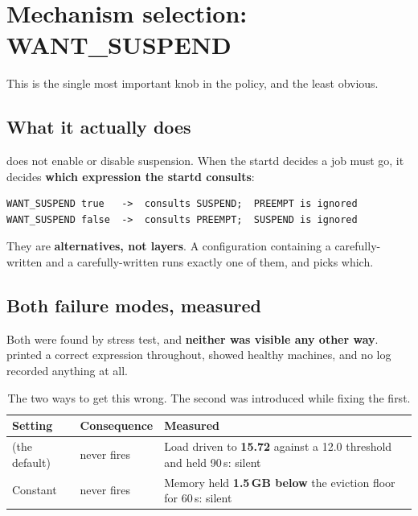 \section{Mechanism selection: WANT\_SUSPEND}
\label{sec:mechanism}

This is the single most important knob in the policy, and the least obvious.

\subsection{What it actually does}

 does not enable or disable suspension. When the startd decides
a job must go, it decides \textbf{which expression the startd consults}:

\begin{lstlisting}
WANT_SUSPEND true   ->  consults SUSPEND;  PREEMPT is ignored
WANT_SUSPEND false  ->  consults PREEMPT;  SUSPEND is ignored
\end{lstlisting}

\begin{keypoint}
They are \textbf{alternatives, not layers}. A configuration containing a
carefully-written  and a carefully-written  runs exactly
one of them, and  picks which.
\end{keypoint}

\subsection{Both failure modes, measured}

Both were found by stress test, and \textbf{neither was visible any other way}.
 printed a correct expression throughout,
 showed healthy machines, and no log recorded anything at all.

\begin{table}[H]
\centering
\begin{tabularx}{\textwidth}{L{0.20\textwidth} L{0.24\textwidth} Y}
\toprule
\textbf{Setting} & \textbf{Consequence} & \textbf{Measured} \\
\midrule
{} (the default) &  never fires & Load driven to \textbf{15.72} against a 12.0 threshold and held 90\,s: silent \\
Constant  &  never fires & Memory held \textbf{1.5\,GB below} the eviction floor for 60\,s: silent \\
\bottomrule
\end{tabularx}
\caption{The two ways to get this wrong. The second was introduced while fixing the first.}
\end{table}

